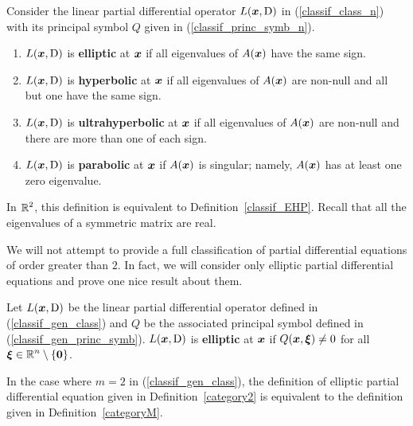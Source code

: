 \begin{defn}\label{category2}
Consider the linear partial differential operator $L({\bm{x}}, \operatorname{D})$ in
(\ref{classif_class_n}) with its principal symbol $Q$ given in 
(\ref{classif_princ_symb_n}).
\begin{enumerate}
\item $L({\bm{x}}, \operatorname{D})$ is
  {\bfseries elliptic}
  at ${\bm{x}}$ if all eigenvalues of $A({\bm{x}})$ have the same sign. 
\item $L({\bm{x}}, \operatorname{D})$ is
  {\bfseries hyperbolic}
  at ${\bm{x}}$ if all eigenvalues of $A({\bm{x}})$ are non-null and all
  but one have the same sign.
\item $L({\bm{x}}, \operatorname{D})$ is 
{\bfseries ultrahyperbolic}
 at
${\bm{x}}$ if all eigenvalues of $A({\bm{x}})$ are non-null and there
are more than one of each sign.
\item $L({\bm{x}}, \operatorname{D})$ is {\bfseries parabolic}
 at ${\bm{x}}$ if
$A({\bm{x}})$ is singular; namely, $A({\bm{x}})$ has at least one zero
eigenvalue.
\end{enumerate}
\end{defn}

In $\displaystyle \mathbb{R}^2$, this definition is equivalent to
Definition~\ref{classif_EHP}.  Recall that all the eigenvalues of a
symmetric matrix are real.

We will not attempt to provide a full classification of partial
differential equations of order greater than $2$.   In fact, we will
consider only elliptic partial differential equations and 
prove one nice result about them.

\begin{defn}\label{categoryM}
Let $L({\bm{x}}, \operatorname{D})$ be the linear partial differential operator
defined in (\ref{classif_gen_class}) and $Q$ be the associated principal
symbol defined in (\ref{classif_gen_princ_symb}).
$L({\bm{x}}, \operatorname{D})$ is
{\bfseries elliptic}
at ${\bm{x}}$ if $\displaystyle Q({\bm{x}}, {\bm{\xi}}) \neq 0$ for all
$\displaystyle {\bm{\xi}} \in \mathbb{R}^n\setminus \{{\bm{0}}\}$.
\end{defn}

In the case where $m=2$ in (\ref{classif_gen_class}), the definition of
elliptic partial differential equation given in
Definition~\ref{category2} is equivalent to
the definition given in Definition~\ref{categoryM}.

